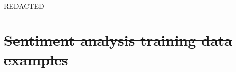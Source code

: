 \documentclass[smallextended,natbib]{svjour3}       %
\providecommand{\DIFdel}[1]{{\protect\color{red}\sout{#1}}}                      %
\providecommand{\DIFdelbegin}{} %
\newcommand{\DIFscaledelfig}{0.5}
\newlength{\DIFdelgraphicswidth} %
\newlength{\DIFdelgraphicsheight} %
\newcommand{\DIFdelincludegraphics}[2][]{%
\sbox{\DIFdelgraphicsbox}{\DIFOincludegraphics[#1]{#2}}%
\settoboxwidth{\DIFdelgraphicswidth}{\DIFdelgraphicsbox} %
\settoboxtotalheight{\DIFdelgraphicsheight}{\DIFdelgraphicsbox} %
\scalebox{\DIFscaledelfig}{%
\parbox[b]{\DIFdelgraphicswidth}{\usebox{\DIFdelgraphicsbox}\\[-\baselineskip] \rule{\DIFdelgraphicswidth}{0em}}\llap{\resizebox{\DIFdelgraphicswidth}{\DIFdelgraphicsheight}{%
\setlength{\unitlength}{\DIFdelgraphicswidth}%
\begin{picture}(1,1)%
\thicklines\linethickness{2pt} %
{\color[rgb]{1,0,0}\put(0,0){\framebox(1,1){}}}%
{\color[rgb]{1,0,0}\put(0,0){\line( 1,1){1}}}%
{\color[rgb]{1,0,0}\put(0,1){\line(1,-1){1}}}%
\end{picture}%
}\hspace*{3pt}}} %
} %
\DeclareRobustCommand{\DIFdelbegin}{\DIFOdelbegin \let\includegraphics\DIFdelincludegraphics} %
\begin{document}
\begin{acknowledgements}

REDACTED

\end{acknowledgements}



\DIFdelbegin %

\clearpage

\appendixpage
\appendix

\section[]{\DIFdel{Sentiment analysis training data examples}}%
\addtocounter{section}{-1}%
\end{document}
